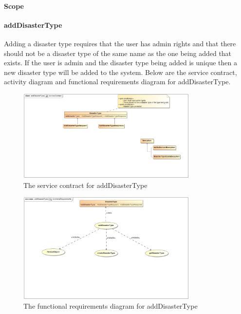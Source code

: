 \paragraph{Scope}


\paragraph{addDisasterType}

Adding a disaster type requires that the user has admin rights and that there should not be a disaster type of the same name as the one being added that exists. If the user is admin and the disaster type being added is unique then a new disaster type will be added to the system. Below are the service contract, activity diagram and functional requirements diagram for addDisasterType.

\begin{figure}[ht!]
	\centering
	\includegraphics[width=90mm]{../images/addDisasterTypeServiceContract.jpg}
	\caption{The service contract for addDisasterType \label{overflow}}
\end{figure}

\begin{figure}[ht!]
\centering
\includegraphics[width=90mm]{../images/AddDisasterTypeFunctionalRequirements.jpg}
\caption{The functional requirements diagram for addDisasterType \label{overflow}}
\end{figure}

